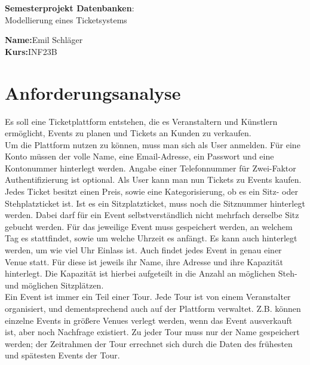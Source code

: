\documentclass[12pt, oneside, a4paper]{article}
\newcommand{\projektname}{Modellierung eines Ticketsystems}
\newcommand{\autor}{Emil Schläger}
\newcommand{\matrikelnummer}{2988631}
\begin{document}
	\begin{center}
		\large
		\vspace{3cm}
		\textbf{Semesterprojekt Datenbanken}:\\
		\projektname{}
	\end{center}
	\vfill
	\textbf{Name:}\hfill \autor{}\\
	\textbf{Kurs:}\hfill INF23B
	

	\newpage
	\tableofcontents
	\newpage
	\listoffigures
	
	
	\newpage
	\section{Anforderungsanalyse}
Es soll eine Ticketplattform entstehen, die es Veranstaltern und Künstlern ermöglicht, Events zu planen und Tickets an Kunden zu verkaufen.\\
Um die Plattform nutzen zu können, muss man sich als User anmelden. Für eine Konto müssen der volle Name, eine Email-Adresse, ein Passwort und eine Kontonummer hinterlegt werden. Angabe einer Telefonnummer für Zwei-Faktor Authentifizierung ist optional. Als User kann man nun Tickets zu Events kaufen. Jedes Ticket besitzt einen Preis, sowie eine Kategorisierung, ob es ein Sitz- oder Stehplatzticket ist. Ist es ein Sitzplatzticket, muss noch die Sitznummer hinterlegt werden. Dabei darf für ein Event selbstverständlich nicht mehrfach derselbe Sitz gebucht werden. Für das jeweilige Event muss gespeichert werden, an welchem Tag es stattfindet, sowie um welche Uhrzeit es anfängt. Es kann auch hinterlegt werden, um wie viel Uhr Einlass ist. Auch findet jedes Event in genau einer Venue statt. Für diese ist jeweils ihr Name, ihre Adresse und ihre Kapazität hinterlegt. Die Kapazität ist hierbei aufgeteilt in die Anzahl an möglichen Steh- und möglichen Sitzplätzen.\\ 
Ein Event ist immer ein Teil einer Tour. Jede Tour ist von einem Veranstalter organisiert, und dementsprechend auch auf der Plattform verwaltet. Z.B. können einzelne Events in größere Venues verlegt werden, wenn das Event ausverkauft ist, aber noch Nachfrage existiert. Zu jeder Tour muss nur der Name gespeichert werden; der Zeitrahmen der Tour errechnet sich durch die Daten des frühesten und spätesten Events der Tour.\\
\end{document}
